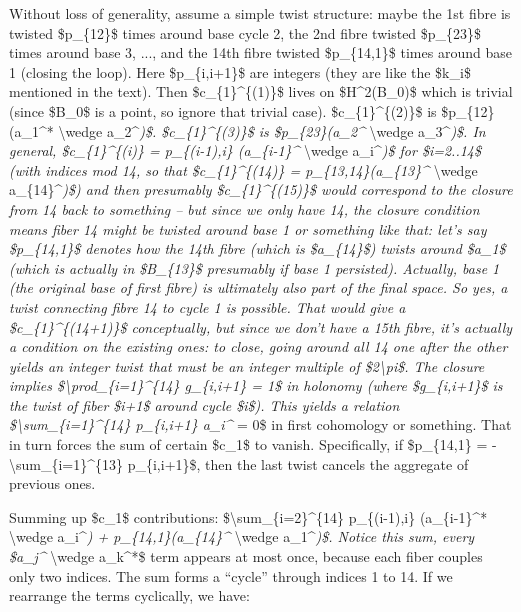 \documentclass[]{article}
\begin{document}
Without loss of generality, assume a simple twist structure: maybe the
1st fibre is twisted \$p\_\{12\}\$ times around base cycle 2, the 2nd
fibre twisted \$p\_\{23\}\$ times around base 3, ..., and the 14th fibre
twisted \$p\_\{14,1\}\$ times around base 1 (closing the loop). Here
\$p\_\{i,i+1\}\$ are integers (they are like the \$k\_i\$ mentioned in
the text). Then \$c\_\{1\}\^{}\{(1)\}\$ lives on \$H\^{}2(B\_0)\$ which
is trivial (since \$B\_0\$ is a point, so ignore that trivial case).
\$c\_\{1\}\^{}\{(2)\}\$ is \$p\_\{12\}(a\_1\^{}* \textbackslash{}wedge
a\_2\^{}\emph{)\$. \$c\_\{1\}\^{}\{(3)\}\$ is \$p\_\{23\}(a\_2\^{}}
\textbackslash{}wedge a\_3\^{}\emph{)\$. In general,
\$c\_\{1\}\^{}\{(i)\} = p\_\{(i-1),i\} (a\_\{i-1\}\^{}}
\textbackslash{}wedge a\_i\^{}\emph{)\$ for \$i=2..14\$ (with indices
mod 14, so that \$c\_\{1\}\^{}\{(14)\} = p\_\{13,14\}(a\_\{13\}\^{}}
\textbackslash{}wedge a\_\{14\}\^{}\emph{)\$) and then presumably
\$c\_\{1\}\^{}\{(15)\}\$ would correspond to the closure from 14 back to
something -- but since we only have 14, the closure condition means
fiber 14 might be twisted around base 1 or something like that: let's
say \$p\_\{14,1\}\$ denotes how the 14th fibre (which is \$a\_\{14\}\$)
twists around \$a\_1\$ (which is actually in \$B\_\{13\}\$ presumably if
base 1 persisted). Actually, base 1 (the original base of first fibre)
is ultimately also part of the final space. So yes, a twist connecting
fibre 14 to cycle 1 is possible. That would give a
\$c\_\{1\}\^{}\{(14+1)\}\$ conceptually, but since we don't have a 15th
fibre, it's actually a condition on the existing ones: to close, going
around all 14 one after the other yields an integer twist that must be
an integer multiple of \$2\textbackslash{}pi\$. The closure implies
\$\textbackslash{}prod\_\{i=1\}\^{}\{14\} g\_\{i,i+1\} = 1\$ in holonomy
(where \$g\_\{i,i+1\}\$ is the twist of fiber \$i+1\$ around cycle
\$i\$). This yields a relation \$\textbackslash{}sum\_\{i=1\}\^{}\{14\}
p\_\{i,i+1\} a\_i\^{}} = 0\$ in first cohomology or something. That in
turn forces the sum of certain \$c\_1\$ to vanish. Specifically, if
\$p\_\{14,1\} = - \textbackslash{}sum\_\{i=1\}\^{}\{13\} p\_\{i,i+1\}\$,
then the last twist cancels the aggregate of previous ones.

Summing up \$c\_1\$ contributions:
\$\textbackslash{}sum\_\{i=2\}\^{}\{14\} p\_\{(i-1),i\} (a\_\{i-1\}\^{}*
\textbackslash{}wedge a\_i\^{}\emph{) + p\_\{14,1\}(a\_\{14\}\^{}}
\textbackslash{}wedge a\_1\^{}\emph{)\$. Notice this sum, every
\$a\_j\^{}} \textbackslash{}wedge a\_k\^{}*\$ term appears at most once,
because each fiber couples only two indices. The sum forms a ``cycle''
through indices 1 to 14. If we rearrange the terms cyclically, we have:
\end{document}
